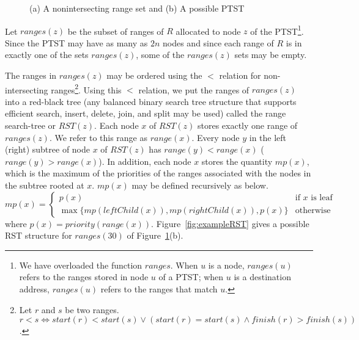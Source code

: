 \begin{figure}
\hspace{1in}
\caption{(a) A nonintersecting range set\label{tab:rangeSet}
and (b) A possible PTST}
\end{figure}


Let $ranges(z)$ be the subset of ranges of $R$ allocated to node $z$ of the
PTST\footnote{We have overloaded the function $ranges$. When $u$ is a node,
$ranges(u)$ refers to the ranges stored in node $u$ of a PTST; when $u$ is a destination address, $ranges(u)$ refers to the ranges that match $u$.}.
Since the PTST may have as many as $2n$ nodes and since each range
of $R$ is in exactly one of the sets $ranges(z)$, some of the
$ranges(z)$ sets may be empty.

The ranges in $ranges(z)$
may be ordered using the $<$ relation for non-intersecting ranges\footnote{Let
$r$ and $s$ be two ranges.  
$r < s \Leftrightarrow start(r) < start(s) \vee (start(r) = start(s) \wedge finish(r) > finish(s))$.}.
Using this $<$ relation, we put the ranges of $ranges(z)$ into a red-black
tree (any balanced
binary search tree structure
that supports efficient search, insert, delete, join,
and split may be used)
called the range search-tree or $RST(z)$.
Each node $x$ of $RST(z)$ stores exactly one range of $ranges(z)$. We refer
to this range as $range(x)$. Every node $y$ in the left (right) subtree of
node $x$ of $RST(z)$ has $range(y) < range(x)$ ($range(y) > range(x)$).
In addition, each node $x$ stores the quantity $mp(x)$, which is the
maximum of the priorities of the ranges associated with the nodes in the
subtree rooted at $x$. $mp(x)$ may be defined recursively as below.
$$
mp(x) = \left\{
\begin{array}{ll}
p(x) & \mbox{if $x$ is leaf}  \\
\max{\{mp(leftChild(x)), mp(rightChild(x)), p(x)\}} & \mbox{otherwise}
\end{array}
\right.
$$
where $p(x) = priority(range(x))$.
Figure~\ref{fig:exampleRST}
gives
a possible RST structure for $ranges(30)$ of Figure~\ref{tab:rangeSet}(b).



